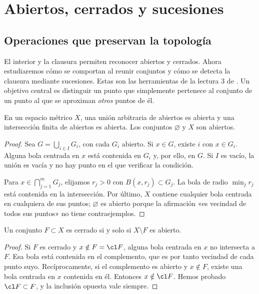 \chapter{Abiertos, cerrados y sucesiones}\label{chap:03}
\section{Operaciones que preservan la topología}
El interior y la clausura permiten reconocer abiertos y cerrados. Ahora estudiaremos cómo se comportan al reunir conjuntos y cómo se detecta la clausura mediante sucesiones. Estas son las herramientas de la lectura 3 de \cite{valencia}. Un objetivo central es distinguir un punto que simplemente pertenece al conjunto de un punto al que se aproximan \emph{otros} puntos de él.

\begin{proposicion}\label{ch03:axiomas}
En un espacio métrico $X$, una unión arbitraria de abiertos es abierta y una intersección finita de abiertos es abierta. Los conjuntos $\varnothing$ y $X$ son abiertos.
\end{proposicion}
\begin{proof}
Sea $G=\bigcup_{i\in I}G_i$, con cada $G_i$ abierto. Si $x\in G$, existe $i$ con $x\in G_i$. Alguna bola centrada en $x$ está contenida en $G_i$ y, por ello, en $G$. Si $I$ es vacío, la unión es vacía y no hay punto en el que verificar la condición.

Para $x\in\bigcap_{j=1}^mG_j$, elijamos $r_j>0$ con $B(x,r_j)\subset G_j$. La bola de radio $\min_jr_j$ está contenida en la intersección. Por último, $X$ contiene cualquier bola centrada en cualquiera de sus puntos; $\varnothing$ es abierto porque la afirmación «es vecindad de todos sus puntos» no tiene contraejemplos.
\end{proof}

\begin{teorema}\label{ch03:complemento}
Un conjunto $F\subset X$ es cerrado si y solo si $X\setminus F$ es abierto.
\end{teorema}
\begin{proof}
Si $F$ es cerrado y $x\notin F=\cl F$, alguna bola centrada en $x$ no intersecta a $F$. Esa bola está contenida en el complemento, que es por tanto vecindad de cada punto suyo. Recíprocamente, si el complemento es abierto y $x\notin F$, existe una bola centrada en $x$ contenida en él. Entonces $x\notin\cl F$. Hemos probado $\cl F\subset F$, y la inclusión opuesta vale siempre.
\end{proof}

